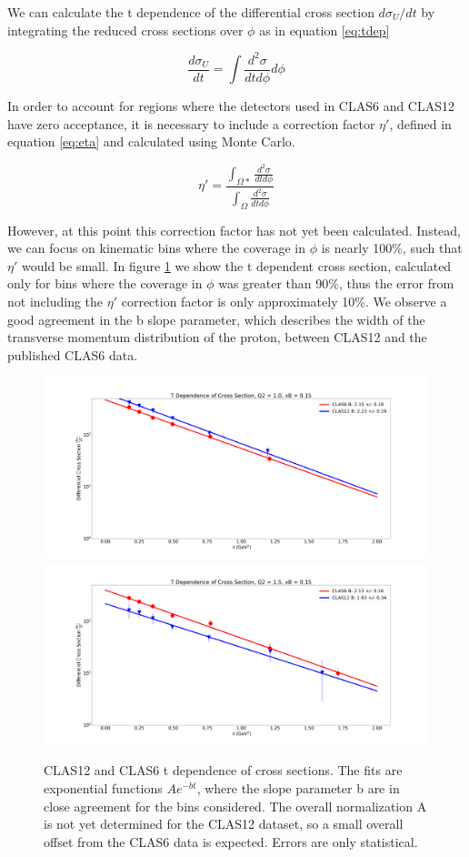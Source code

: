 
We can calculate the t dependence of the differential cross section $d\sigma_U/dt$ by integrating the reduced cross sections over $\phi$ as in equation \ref{eq:tdep}

 \begin{equation}\label{eq:tdep}
    \frac{d\sigma_U}{dt} = \int \frac{d^2\sigma}{dtd\phi} d\phi
\end{equation}

In order to account for regions where the detectors used in CLAS6 and CLAS12 have zero acceptance, it is necessary to include a correction factor $\eta'$, defined in equation \ref{eq:eta} and calculated using Monte Carlo. 

 \begin{equation}\label{eq:eta}
    \eta' = \frac{\int_{\Omega*} \frac{d^2\sigma}{dtd\phi} }{\int_{\Omega} \frac{d^2\sigma}{dtd\phi}}
\end{equation}

However, at this point this correction factor has not yet been calculated. Instead, we can focus on kinematic bins where the coverage in $\phi$ is nearly 100\%, such that $\eta'$ would be small. In figure \ref{fig:tdep} we show the t dependent cross section, calculated only for bins where the coverage in $\phi$ was greater than 90\%, thus the error from not including the $\eta'$ correction factor is only approximately 10\%. We observe a good agreement in the b slope parameter, which describes the width of the transverse momentum distribution of the proton, between CLAS12 and the published CLAS6 data.


\begin{figure}[hbt]
	\centering
	\includegraphics[page=125,width=0.45\linewidth]{Chapters/Ch5-Further/t_dependence/pics/fig_1.0_0.15.png}
	\includegraphics[page=130,width=0.45\linewidth]{Chapters/Ch5-Further/t_dependence/pics/fig_1.5_0.15.png}

	\caption[t dependence]{CLAS12 and CLAS6 t dependence of cross sections. The fits are exponential functions $Ae^{-bt}$, where the slope parameter b are in close agreement for the bins considered. The overall normalization A is not yet determined for the CLAS12 dataset, so a small overall offset from the CLAS6 data is expected. Errors are only statistical.}
	\label{fig:tdep}
\end{figure}


